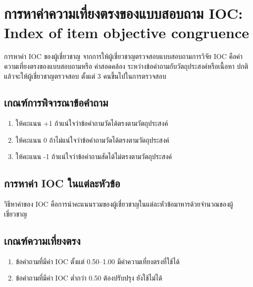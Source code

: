 \renewcommand\thechoice{\Alph{choice}}
\newcommand\choicelabel{\thechoice.}

\newenvironment{choices}%
  {\list{\choicelabel}%
     {\usecounter{choice}\def\makelabel##1{\hss\llap{##1}}%
       \settowidth{\leftmargin}{W.\hskip\labelsep\hskip 2.5em}%
       \def\choice{%
         \item
       } %
       \labelwidth\leftmargin\advance\labelwidth-\labelsep
       \topsep=0pt
       \partopsep=0pt
     }%
  }%
  {\endlist}

\chapter{การหาค่าความเที่ยงตรงของแบบสอบถาม IOC: Index of item objective congruence} \label{app1}

การหาค่า IOC ของผู้เชี่ยวชาญ จากการให้ผู้เชี่ยวชาญตรวจสอบแบบสอบถามการวิจัย IOC คือค่าความเที่ยงตรงของแบบสอบถามหรือ ค่าสอดคล้อง
ระหว่างข้อคำถามกับวัตถุประสงค์หรือเนื้อหา ปกติแล้วจะให้ผู้เชี่ยวชาญตรวจสอบ ตั้งแต่ 3 คนขึ้นไปในการตรวจสอบ

\section{เกณฑ์การพิจารณาข้อคำถาม}
\begin{enumerate}
    \item ให้คะแนน +1 ถ้าแน่ใจว่าข้อคำถามวัดได้ตรงตามวัตถุประสงค์
    \item ให้คะแนน 0 ถ้าไม่แน่ใจว่าข้อคำถามวัดได้ตรงตามวัตถุประสงค์
    \item ให้คะแนน -1 ถ้าแน่ใจว่าข้อคำถามสัดได้ไม่ตรงตามวัตถุประสงค์
\end{enumerate}

\section{การหาค่า IOC ในแต่ละหัวข้อ}
วิธีหาค่าของ IOC คือการนำคะแนนรวมของผู้เชี่ยวชาญในแต่ละหัวข้อมาหารด้วยจำนวณของผู้เชี่ยวชาญ

\section{เกณฑ์ความเที่ยงตรง}
\begin{enumerate}
    \item ข้อคำถามที่มีค่า IOC ตั้งแต่ 0.50--1.00 มีค่าความเที่ยงตรงที่ใช้ได้
    \item ข้อคำถามที่มีค่า IOC ต่ำกว่า 0.50 ต้องปรับปรุง ยังใช้ไม่ได้
\end{enumerate}

